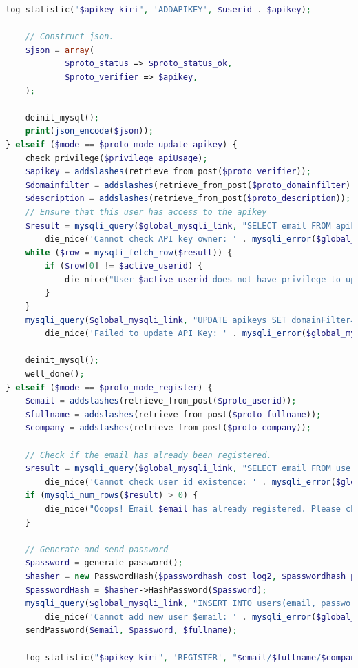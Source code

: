 \documentclass[a4paper,twoside]{article}
\begin{document}
\begin{enumerate}
\begin{lstlisting}[language=PHP,basicstyle=\tiny,caption=handle.php,label={lst:handle.php}]
	log_statistic("$apikey_kiri", 'ADDAPIKEY', $userid . $apikey);
	
	// Construct json.
	$json = array(
			$proto_status => $proto_status_ok,
			$proto_verifier => $apikey,
	);
	
	deinit_mysql();
	print(json_encode($json));
} elseif ($mode == $proto_mode_update_apikey) {
	check_privilege($privilege_apiUsage);
	$apikey = addslashes(retrieve_from_post($proto_verifier));
	$domainfilter = addslashes(retrieve_from_post($proto_domainfilter));
	$description = addslashes(retrieve_from_post($proto_description));
	// Ensure that this user has access to the apikey
	$result = mysqli_query($global_mysqli_link, "SELECT email FROM apikeys WHERE verifier='apikey'") or
		die_nice('Cannot check API key owner: ' . mysqli_error($global_mysqli_link));
	while ($row = mysqli_fetch_row($result)) {
		if ($row[0] != $active_userid) {
			die_nice("User $active_userid does not have privilege to update API Key $apikey");
		}
	}
	mysqli_query($global_mysqli_link, "UPDATE apikeys SET domainFilter='$domainfilter', description='$description' WHERE verifier='$apikey'") or
		die_nice('Failed to update API Key: ' . mysqli_error($global_mysqli_link));
	
	deinit_mysql();
	well_done();
} elseif ($mode == $proto_mode_register) {
	$email = addslashes(retrieve_from_post($proto_userid));
	$fullname = addslashes(retrieve_from_post($proto_fullname));
	$company = addslashes(retrieve_from_post($proto_company));

	// Check if the email has already been registered.
	$result = mysqli_query($global_mysqli_link, "SELECT email FROM users WHERE email='$email'") or
		die_nice('Cannot check user id existence: ' . mysqli_error($global_mysqli_link));
	if (mysqli_num_rows($result) > 0) {
		die_nice("Ooops! Email $email has already registered. Please check your mailbox or contact hello@kiri.travel");
	}

	// Generate and send password
	$password = generate_password();
	$hasher = new PasswordHash($passwordhash_cost_log2, $passwordhash_portable);
	$passwordHash = $hasher->HashPassword($password); 
	mysqli_query($global_mysqli_link, "INSERT INTO users(email, password, privilegeApiUsage, fullName, company) VALUES('$email', '$passwordHash', 1, '$fullname', '$company')") or
		die_nice('Cannot add new user $email: ' . mysqli_error($global_mysqli_link));	
	sendPassword($email, $password, $fullname);

	log_statistic("$apikey_kiri", 'REGISTER', "$email/$fullname/$company");
	

\end{lstlisting}
\end{enumerate}
\end{document}
